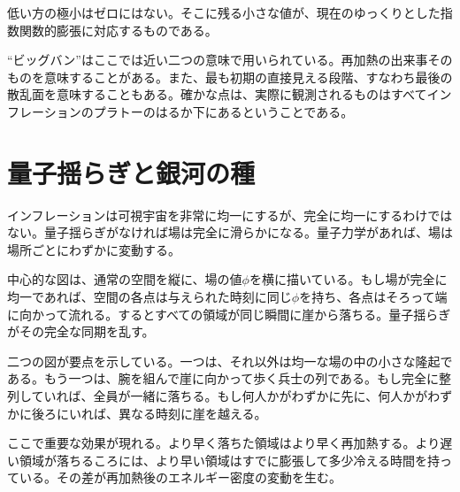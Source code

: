 低い方の極小はゼロにはない。そこに残る小さな値が、現在のゆっくりとした指数関数的膨張に対応するものである。

\begin{classroomqa}
\end{classroomqa}

``ビッグバン''はここでは近い二つの意味で用いられている。再加熱の出来事そのものを意味することがある。また、最も初期の直接見える段階、すなわち最後の散乱面を意味することもある。確かな点は、実際に観測されるものはすべてインフレーションのプラトーのはるか下にあるということである。

\begin{classroomqa}
\end{classroomqa}

\section{量子揺らぎと銀河の種}

インフレーションは可視宇宙を非常に均一にするが、完全に均一にするわけではない。量子揺らぎがなければ場は完全に滑らかになる。量子力学があれば、場は場所ごとにわずかに変動する。

中心的な図は、通常の空間を縦に、場の値\(\phi\)を横に描いている。もし場が完全に均一であれば、空間の各点は与えられた時刻に同じ\(\phi\)を持ち、各点はそろって端に向かって流れる。するとすべての領域が同じ瞬間に崖から落ちる。量子揺らぎがその完全な同期を乱す。

二つの図が要点を示している。一つは、それ以外は均一な場の中の小さな隆起である。もう一つは、腕を組んで崖に向かって歩く兵士の列である。もし完全に整列していれば、全員が一緒に落ちる。もし何人かがわずかに先に、何人かがわずかに後ろにいれば、異なる時刻に崖を越える。

ここで重要な効果が現れる。より早く落ちた領域はより早く再加熱する。より遅い領域が落ちるころには、より早い領域はすでに膨張して多少冷える時間を持っている。その差が再加熱後のエネルギー密度の変動を生む。

\begin{classroomqa}
\end{classroomqa}

